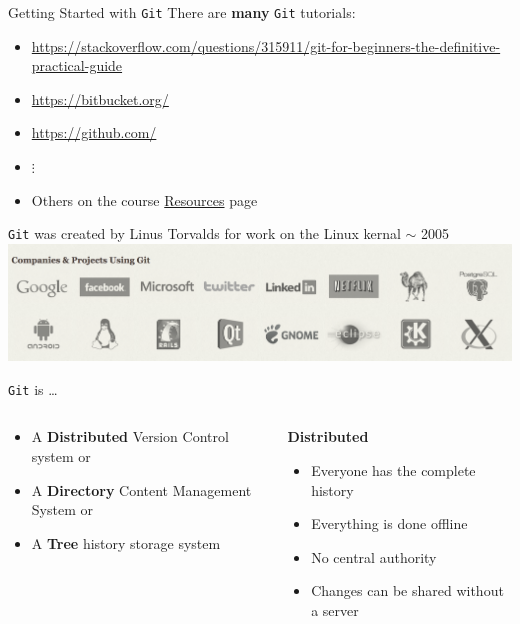 \documentclass[onlymath, nologo]{beamer}
\begin{document}
  \begin{frame}{Getting Started with \texttt{Git}}
    There are \textbf{many} \texttt{Git} tutorials:
    \begin{itemize}
      \item \url{https://stackoverflow.com/questions/315911/git-for-beginners-the-definitive-practical-guide}%
      \item \url{https://bitbucket.org/} 
      \item \url{https://github.com/}
      \item \hspace{2.0em} $\vdots$
      \item Others on the course \href{https://iacs-cs-207.github.io/cs207-F17/resources.html}{Resources} page
    \end{itemize}
    \texttt{Git} was created by Linus Torvalds for work on the Linux kernal $\sim$ 2005 \\[0.5em]
    \centering
    \includegraphics[width=\textwidth]{git_companies.png}
  \end{frame}

  \begin{frame}{\texttt{Git} is \ldots}
    \begin{columns}[c]
      \begin{column}{0.5\textwidth}
        \begin{itemize}
          \item A \textbf{Distributed} Version Control system or \\[1.0em]
          \item A \textbf{Directory} Content Management System or \\[1.0em]
          \item A \textbf{Tree} history storage system
        \end{itemize}
      \end{column}
      \begin{column}{0.5\textwidth}
        \begin{center}
          \textbf{Distributed}
        \end{center}
        \begin{itemize}
          \item Everyone has the complete history
          \item Everything is done offline 
          \item No central authority 
          \item Changes can be shared without a server
        \end{itemize}
        \vfill
      \end{column}
    \end{columns}
  \end{frame}
\end{document}

